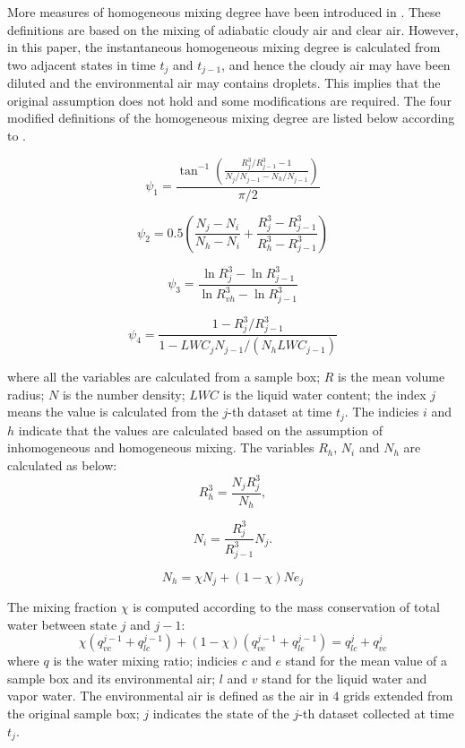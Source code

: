 More measures of homogeneous mixing degree have been introduced in \cite{Lu2011, Lu2014}. 
These definitions are based on the mixing of adiabatic cloudy air and clear air. 
However, in this paper, the instantaneous homogeneous mixing degree is calculated from 
two adjacent states in time $t_j$ and $t_{j-1}$, and hence the cloudy air may have been 
diluted and the environmental air may contains droplets. This implies that the original 
assumption does not hold and some modifications are required. The four modified definitions 
of the homogeneous mixing degree are listed below according to \cite{Lu2011, Lu2014}.

\begin{equation}
\psi_1 = \frac{\tan^{-1}(\frac{R_{j}^3/R_{j-1}^3 - 1}{N_j/N_{j-1} - N_h/N_{j-1}})}{\pi/2}
\label{phi1}
\end{equation}

\begin{equation}
\psi_2 = 0.5(\frac{N_j-N_{i}}{N_h-N_i} + \frac{R_j^3-R_{j-1}^3}{R_h^3 - R_{j-1}^3})
\label{phi2}
\end{equation}

\begin{equation}
\psi_3 = \frac{\ln R_j^3 - \ln R_{j-1}^3}{\ln R_{vh}^3 - \ln R_{j-1}^3}
\label{phi3}
\end{equation}

\begin{equation}
\psi_4 = \frac{1 - R_{j}^3/R_{j-1}^3}{1 - LWC_{j}N_{j-1}/(N_h LWC_{j-1})}
\label{phi4}
\end{equation}

where all the variables are calculated from a sample box; $R$ is the mean volume radius; $N$ is the number density; $LWC$ is the liquid water content; the index $j$ means the value is calculated from the $j$-th dataset at time $t_j$. The indicies $i$ and $h$ indicate that the values are calculated based on the assumption of inhomogeneous and homogeneous mixing. The variables $R_h$, $N_i$ and $N_h$ are calculated as below:
\[
R_h^3 = \frac{N_jR_j^3}{N_h},
\]

\[
N_i = \frac{R_j^3}{R_{j-1}^3}N_j.
\]

\[
N_h = \chi N_j + (1 - \chi) Ne_j
\]

The mixing fraction $\chi$ is computed according to the mass conservation of total water between state $j$ and $j-1$:
\begin{equation}
\chi(q^{j-1}_{vc} + q^{j-1}_{lc}) + (1-\chi)(q^{j-1}_{ve} + q^{j-1}_{le}) = q^{j}_{lc} + q^{j}_{vc}
\end{equation}
where $q$ is the water mixing ratio; indicies $c$ and $e$ stand for the mean 
value of a sample box and its environmental air; $l$ and $v$ stand for the liquid 
water and vapor water. The environmental air is defined as the air in $4$ 
grids extended from the original sample box; $j$ indicates the state of the $j$-th dataset 
collected at time $t_j$.

